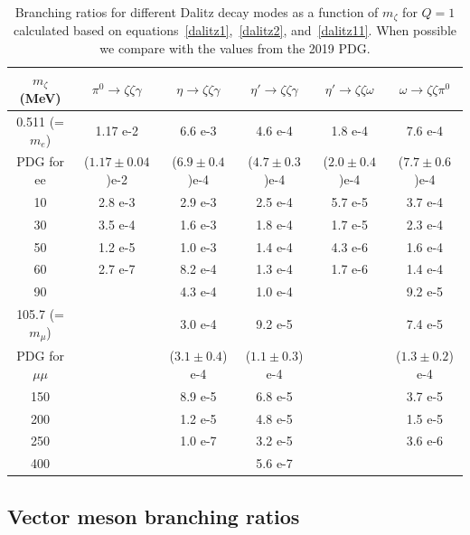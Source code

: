 \documentclass[12pt]{article}
\begin{document}
\begin{table}
  \begin{center}
    { \footnotesize
  \begin{tabular}{|c|c|c|c|c|c|}
    \hline
    $m_\zeta$ (MeV) & $\pi^0 \to \zeta \zeta \gamma$ & $\eta \to \zeta \zeta \gamma$
    & $\eta' \to \zeta \zeta \gamma$ & $\eta' \to \zeta \zeta \omega$
    & $\omega \to \zeta \zeta \pi^0$ \\ \hline \hline
  0.511 (=$m_e$)  & 1.17 e-2 & 6.6 e-3 & 4.6 e-4 & 1.8 e-4 & 7.6 e-4 \\
  PDG for ee  & ($1.17 \pm 0.04$)e-2 & ($6.9 \pm 0.4$)e-4 & ($4.7 \pm 0.3$)e-4  &
  ($2.0 \pm 0.4$)e-4  & ($7.7 \pm 0.6$)e-4 \\ \hline
  10              & 2.8 e-3  & 2.9 e-3 & 2.5 e-4 & 5.7 e-5 & 3.7 e-4 \\
  30              & 3.5 e-4  & 1.6 e-3 & 1.8 e-4 & 1.7 e-5 & 2.3 e-4 \\
  50              & 1.2 e-5  & 1.0 e-3 & 1.4 e-4 & 4.3 e-6 & 1.6 e-4 \\
  60              & 2.7 e-7  & 8.2 e-4 & 1.3 e-4 & 1.7 e-6 & 1.4 e-4 \\
  90              &         & 4.3 e-4 & 1.0 e-4 &        & 9.2 e-5 \\ \hline
  105.7 (=$m_\mu$)&         & 3.0 e-4 & 9.2 e-5 &         & 7.4 e-5 \\
  PDG for $\mu\mu$ &      & ($3.1 \pm 0.4$) e-4 & ($1.1 \pm 0.3$) e-4 & &
                      ($1.3 \pm 0.2$) e-4 \\ \hline
  150             &        & 8.9 e-5  & 6.8 e-5 &        & 3.7 e-5 \\
  200             &        & 1.2 e-5  & 4.8 e-5 &        & 1.5 e-5 \\
  250             &        & 1.0 e-7 & 3.2 e-5 &         & 3.6 e-6 \\
  400             &        &        & 5.6 e-7 &         &        \\ \hline 
  \end{tabular}
  }
  \caption{\protect Branching ratios for different Dalitz decay modes as 
    a function of $m_\zeta$ for $Q=1$ calculated 
    based on equations~\ref{dalitz1},~\ref{dalitz2}, and~\ref{dalitz11}. 
When possible we compare with 
  the values from the 2019 PDG.}
\label{tab:dalitz1}
  \end{center}
\end{table}

\subsection{Vector meson branching ratios}
\end{document}
